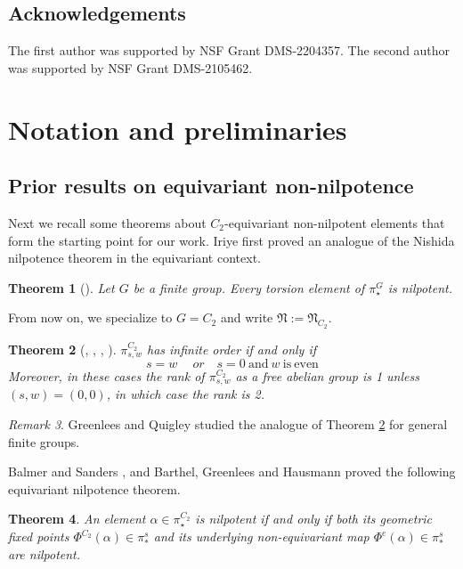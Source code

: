 \documentclass[psamsfonts]{amsart}
\newcommand{\fN}{\mathfrak N}
\newtheorem{theorem}{Theorem}[section]
\theoremstyle{definition}
\theoremstyle{remark}
\newtheorem{remark}[theorem]{Remark}
\numberwithin{equation}{section}
\begin{document}
\subsection{Acknowledgements}
The first author was supported by NSF Grant DMS-2204357.
The second author was supported by NSF Grant DMS-2105462.


\section{Notation and preliminaries} \label{sec:preliminaries}


\subsection{Prior results on equivariant non-nilpotence}
Next we recall some theorems about $C_2$-equivariant non-nilpotent elements that form the starting point for our work. Iriye first proved an analogue of the Nishida nilpotence theorem in the equivariant context.
\begin{theorem}[\cite{I}] \label{thm:torsion-nilpotent}
Let $G$ be a finite group.
Every torsion element of $\pi_\star^G$ is nilpotent.
\end{theorem}
From now on, we specialize to $G=C_2$ and write $\fN := \fN_{C_2}$.

\begin{theorem}[\cite{Lin}, \cite{GM}, \cite{behrens-shah}, \cite{GQ}]\label{thm: rank of stable stems}
$\pi_{s, w}^{C_2}$ has infinite order if and only if
    \[s=w\quad \ or \quad s=0\ \mathrm{and}\ w\ \mathrm{is}\ \mathrm{even}\]
Moreover, in these cases the rank of $\pi_{s, w}^{C_2}$ as a free abelian group is 1 unless $(s,w)=(0,0)$, in which case the rank is 2.
\end{theorem}


\begin{remark}
Greenlees and Quigley \cite{GQ} studied the analogue of Theorem \ref{thm: rank of stable stems} for general finite groups.
\end{remark}

Balmer and Sanders \cite{BS}, and Barthel, Greenlees and Hausmann \cite{BGH} proved the following equivariant nilpotence theorem.
\begin{theorem}\label{thm: BS, BGH}
An element $\alpha\in \pi_\star^{C_2}$ is nilpotent if and only if both its geometric fixed points $\Phi^{C_2}(\alpha)\in \pi_*^s$ and its underlying non-equivariant map $\Phi^e(\alpha)\in \pi_*^s$ are nilpotent.
\end{theorem}
\end{document}
